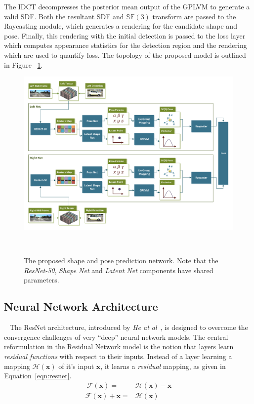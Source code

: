 The IDCT decompresses the posterior mean output of the GPLVM to generate a valid SDF\@. Both the 
resultant SDF and \( \mathbb{SE}(3) \) transform are passed to the Raycasting module, which generates 
a rendering for the candidate shape and pose. Finally, this rendering with the initial detection is passed 
to the loss layer which computes appearance statistics for the detection region and the rendering 
which are used to quantify loss. The topology of the proposed model is outlined in Figure
~\ref{figure:spp_pipeline}.
\begin{landscape}
  \begin{figure}[!htbp]
    \centering
    \includegraphics[width=.9\linewidth]{figures/spp/model.pdf}
    \caption[Shape and Pose Prediction Network]{The proposed shape and pose prediction network. 
    Note that the \textit{ResNet-50}, \textit{Shape Net} and \textit{Latent Net} components have 
    shared parameters.}
~\label{figure:spp_pipeline}
  \end{figure}
\end{landscape}

\subsection{Neural Network Architecture}
~\label{subsec:spp_neural_architecture}
The ResNet architecture, introduced by \textit{He at al}~\cite{He2015}, is designed to overcome the 
convergence challenges of very ``deep'' neural network models. The central reformulation in the 
Residual Network model is the notion that layers learn \textit{residual functions} with respect to 
their inputs. Instead of a layer learning a mapping \( \mathcal{H}(\bm{x}) \) of it's input \( \bm{x} \), 
it learns a \textit{residual} mapping, as given in Equation~\ref{eqn:resnet}.
\begin{align}
~\label{eqn:resnet}
  \mathcal{F}(\bm{x}) ={}& \mathcal{H}(\bm{x}) - \bm{x}\\
  \mathcal{F}(\bm{x}) + \bm{x} ={}& \mathcal{H}(\bm{x})
\end{align}

